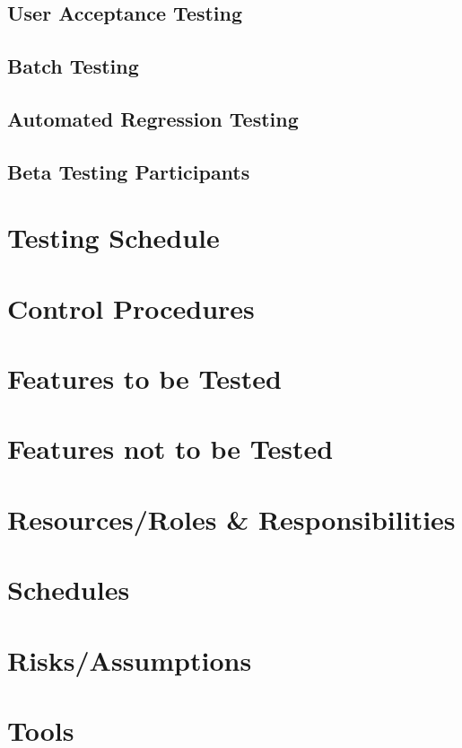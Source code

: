 \documentclass{article}
\begin{document}
\subsection{User Acceptance Testing }
\subsection{Batch Testing}
\subsection{Automated Regression Testing }
\subsection{Beta Testing Participants}

\newpage

\section{Testing Schedule}

\newpage

\section{Control Procedures}

\newpage

\section{Features to be Tested}

\newpage

\section{Features not to be Tested}

\newpage

\section{Resources/Roles & Responsibilities}

\newpage

\section{Schedules}

\newpage

\section{Risks/Assumptions}

\newpage

\section{Tools}

\newpage
\end{document}
